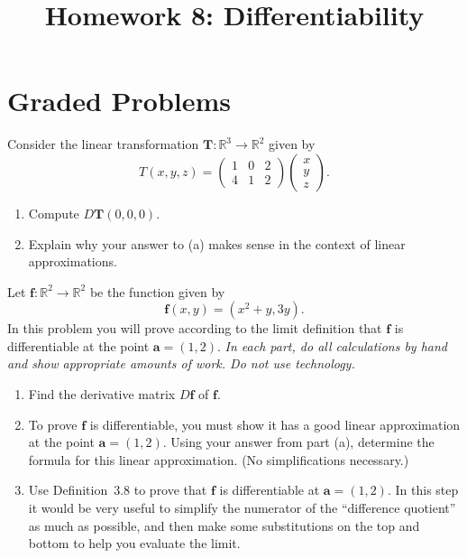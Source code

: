 \documentclass{ximera}
\title{Homework 8: Differentiability}
\begin{document}
\begin{abstract}
\end{abstract}
\maketitle

\section*{Graded Problems}

\begin{problem} Consider the linear transformation $\mathbf{T}:\mathbb{R}^3\rightarrow\mathbb{R}^2$ given by
\[
T(x,y,z) = \left(\begin{array}{ccc}
1&0&2\\
4&1&2
\end{array}\right)\left(\begin{array}{c}
x\\
y\\
z
\end{array}\right).
\]
\begin{enumerate}
\item Compute $D\mathbf{T}(0,0,0)$.
\item Explain why your answer to (a) makes sense in the context of linear approximations.
\end{enumerate}
\end{problem}

\begin{problem} Let $\mathbf{f}:\mathbb{R}^{2} \to \mathbb{R}^{2}$ be the function given by \[ \mathbf{f}(x,y)=(x^{2}+y, 3y).\]  In this problem you will prove according to the limit definition that $\mathbf{f}$ is differentiable at the point $\mathbf{a}=(1,2)$. \emph{In each part, do all calculations by hand and show appropriate amounts of work. Do not use technology.}
\begin{enumerate}
\item Find the derivative matrix $D\mathbf{f}$ of $\mathbf{f}$.

\item To prove $\mathbf{f}$ is differentiable, you must show it has a good linear approximation at the point $\mathbf{a}=(1,2)$.  Using your answer from part (a), determine the formula for this linear approximation.  (No simplifications necessary.)

\item Use Definition~3.8 to prove that $\mathbf{f}$ is differentiable at $\mathbf{a}=(1,2)$.  In this step it would be very useful to simplify the numerator of the ``difference quotient'' as much as possible, and then make some substitutions on the top and bottom to help you evaluate the limit.
\end{enumerate}
\end{problem}
\end{document}
